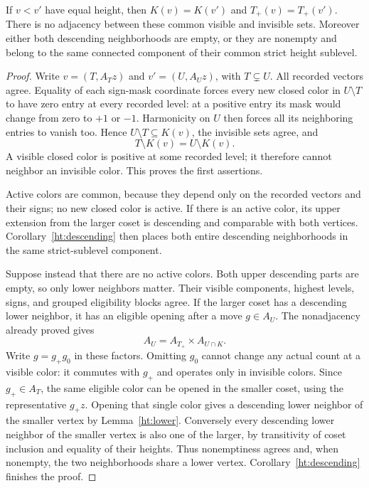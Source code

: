 \begin{lemma}
\label{ht:ties}
If \(v<v'\) have equal height, then \(K(v)=K(v')\) and
\(T_+(v)=T_+(v')\).
There is no adjacency between these common visible and invisible sets.
Moreover either both descending neighborhoods are empty, or they are
nonempty and belong to the same connected component of their common
strict height sublevel.
\end{lemma}

\begin{proof}
Write \(v=(T,A_Tz)\) and \(v'=(U,A_Uz)\), with \(T\subsetneq U\).
All recorded vectors agree.  Equality of each sign-mask coordinate
forces every new closed color in \(U\setminus T\) to have zero entry
at every recorded level: at a positive entry its mask would change
from zero to \(+1\) or \(-1\).
Harmonicity on \(U\) then forces all its neighboring entries to vanish
too.  Hence \(U\setminus T\subseteq K(v)\), the invisible sets agree,
and
\[
 T\setminus K(v)=U\setminus K(v).
\]
A visible closed color is positive at some recorded level; it therefore
cannot neighbor an invisible color.  This proves the first assertions.

Active colors are common, because they depend only on the recorded
vectors and their signs; no new closed color is active.
If there is an active color, its upper extension from the larger
coset is descending and comparable with both vertices.
Corollary~\ref{ht:descending} then places both entire descending
neighborhoods in the same strict-sublevel component.

Suppose instead that there are no active colors.
Both upper descending parts are empty, so only lower neighbors matter.
Their visible components, highest levels, signs, and grouped
eligibility blocks agree.
If the larger coset has a descending lower neighbor, it has an
eligible opening after a move \(g\in A_U\).
The nonadjacency already proved gives
\[
 A_U=A_{T_+}\times A_{U\cap K}.
\]
Write \(g=g_+g_0\) in these factors.
Omitting \(g_0\) cannot change any actual count at a visible color:
it commutes with \(g_+\) and operates only in invisible colors.
Since \(g_+\in A_T\), the same eligible color can be opened in the
smaller coset, using the representative \(g_+z\).
Opening that single color gives a descending lower neighbor of the
smaller vertex by Lemma~\ref{ht:lower}.
Conversely every descending lower neighbor of the smaller vertex
is also one of the larger, by transitivity of coset inclusion and
equality of their heights.
Thus nonemptiness agrees and, when nonempty, the two neighborhoods
share a lower vertex.
Corollary~\ref{ht:descending} finishes the proof.
\end{proof}

